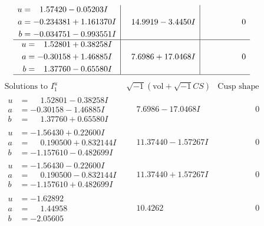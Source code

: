 \documentclass[1p]{elsarticle_modified}
\theoremstyle{definition}
\newcommand{\I}{\sqrt{-1}}
\begin{document}
$$\begin{array}{c|c|c}
\begin{aligned}
u &= \phantom{-}1.57420 - 0.05203 I \\
a &= -0.234381 + 1.161370 I \\
b &= -0.034751 - 0.993551 I\end{aligned}
 & \phantom{-}14.9919 - 3.4450 I & \phantom{-0.000000 } 0 \\ \hline\begin{aligned}
u &= \phantom{-}1.52801 + 0.38258 I \\
a &= -0.30158 + 1.46885 I \\
b &= \phantom{-}1.37760 - 0.65580 I\end{aligned}
 & \phantom{-}7.6986 + 17.0468 I & \phantom{-0.000000 } 0\\
 \hline 
 \end{array}$$\newpage$$\begin{array}{c|c|c}  
\text{Solutions to }I^u_{1}& \I (\text{vol} + \sqrt{-1}CS) & \text{Cusp shape}\\
 \hline 
\begin{aligned}
u &= \phantom{-}1.52801 - 0.38258 I \\
a &= -0.30158 - 1.46885 I \\
b &= \phantom{-}1.37760 + 0.65580 I\end{aligned}
 & \phantom{-}7.6986 - 17.0468 I & \phantom{-0.000000 } 0 \\ \hline\begin{aligned}
u &= -1.56430 + 0.22600 I \\
a &= \phantom{-}0.190500 + 0.832144 I \\
b &= -1.157610 - 0.482699 I\end{aligned}
 & \phantom{-}11.37440 - 1.57267 I & \phantom{-0.000000 } 0 \\ \hline\begin{aligned}
u &= -1.56430 - 0.22600 I \\
a &= \phantom{-}0.190500 - 0.832144 I \\
b &= -1.157610 + 0.482699 I\end{aligned}
 & \phantom{-}11.37440 + 1.57267 I & \phantom{-0.000000 } 0 \\ \hline\begin{aligned}
u &= -1.62892\phantom{ +0.000000I} \\
a &= \phantom{-}1.44958\phantom{ +0.000000I} \\
b &= -2.05605\phantom{ +0.000000I}\end{aligned}
 & \phantom{-}10.4262\phantom{ +0.000000I} & \phantom{-0.000000 } 0 \\ \hline\begin{aligned}

\end{aligned}
\end{array}$$
\end{document}
